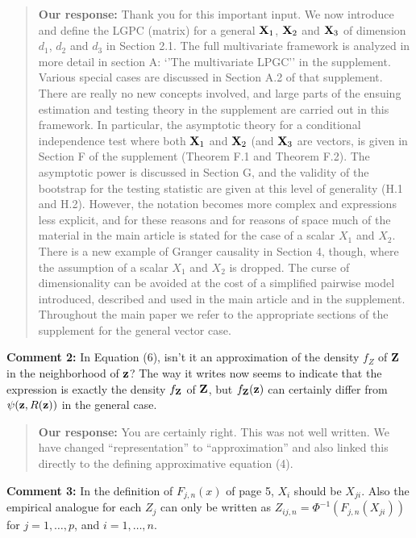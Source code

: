 \documentclass[
  12pt,
  letterpaper]{article}
\numberwithin{equation}{section}
\begin{document}
\begin{quote}
\textbf{Our response:} Thank you for this important input. We now introduce and define the LGPC (matrix) for a general \({\bf X}_1\), \({\bf X}_2\) and \({\bf X}_3\) of dimension \(d_1\), \(d_2\) and \(d_3\) in Section 2.1. The full multivariate framework is analyzed in more detail in section A: `'The multivariate LPGC'' in the supplement. Various special cases are discussed in Section A.2 of that supplement. There are really no new concepts involved, and large parts of the ensuing estimation and testing theory in the supplement are carried out in this framework. In particular, the asymptotic theory for a conditional independence test where both \({\bf X}_1\) and \({\bf X}_2\) (and \({\bf X}_3\) are vectors, is given in Section F of the supplement (Theorem F.1 and Theorem F.2). The asymptotic power is discussed in Section G, and the validity of the bootstrap for the testing statistic are given at this level of generality (H.1 and H.2). However, the notation becomes more complex and expressions less explicit, and for these reasons and for reasons of space much of the material in the main article is stated for the case of a scalar \(X_1\) and \(X_2\). There is a new example of Granger causality in Section 4, though, where the assumption of a scalar \(X_1\) and \(X_2\) is dropped. The curse of dimensionality can be avoided at the cost of a simplified pairwise model introduced, described and used in the main article and in the supplement. Throughout the main paper we refer to the appropriate sections of the supplement for the general vector case.
\end{quote}

\textbf{Comment 2:} In Equation (6), isn't it an approximation of the density \(f_Z\) of \({\bf Z}\) in the neighborhood of \({\bf z}\)? The way it writes now seems to indicate that the expression is exactly the density \(f_{\bf Z}\) of \({\bf Z}\), but \(f_{\bf Z}({\bf z})\) can certainly differ from \(\psi({\bf z}, R({\bf z}))\) in the general case.

\begin{quote}
\textbf{Our response:} You are certainly right. This was not well written. We have changed ``representation'' to ``approximation'' and also linked this directly to the defining approximative equation (4).
\end{quote}

\textbf{Comment 3:} In the definition of \(F_{j,n}(x)\) of page 5, \(X_i\) should be \(X_{ji}\). Also the empirical analogue for each \(Z_j\) can only be written as \(Z_{ij,n} = \Phi^{-1}(F_{j,n}(X_{ji}))\) for \(j=1,\ldots,p\), and \(i=1,\ldots,n\).
\end{document}
